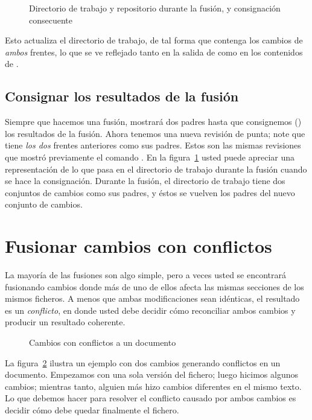 \begin{figure}[ht]
  \centering
  \caption{Directorio de trabajo y repositorio durante la fusión, y
  consignación consecuente}
  \label{fig:tour-merge:merge}
\end{figure}

Esto actualiza el directorio de trabajo, de tal forma que contenga los
cambios de \emph{ambos} frentes, lo que se ve reflejado tanto en la
salida de  como en los contenidos de .

\subsection{Consignar los resultados de la fusión}

Siempre que hacemos una fusión,  mostrará dos padres
hasta que consignemos () los resultados de la fusión.
Ahora tenemos una nueva revisión de punta; note que tiene \emph{los
dos} frentes anteriores como sus padres. Estos son las mismas
revisiones que mostró previamente el comando .
En la figura~\ref{fig:tour-merge:merge} usted puede apreciar una
representación de lo que pasa en el directorio de trabajo durante la
fusión cuando se hace la consignación. Durante la fusión, el
directorio de trabajo tiene dos conjuntos de cambios como sus padres,
y éstos se vuelven los padres del nuevo conjunto de cambios.

\section{Fusionar cambios con conflictos}

La mayoría de las fusiones son algo simple, pero a veces usted se
encontrará fusionando cambios donde más de uno de ellos afecta las
mismas secciones de los mismos ficheros. A menos que ambas
modificaciones sean idénticas, el resultado es un \emph{conflicto}, en
donde usted debe decidir cómo reconciliar ambos cambios y producir un
resultado coherente.

\begin{figure}[ht]
  \centering
  \caption{Cambios con conflictos a un documento}
  \label{fig:tour-merge:conflict}
\end{figure}

La figura~\ref{fig:tour-merge:conflict} ilustra un ejemplo con dos
cambios generando conflictos en un documento. Empezamos con una sola
versión del fichero; luego hicimos algunos cambios; mientras tanto,
alguien más  hizo cambios diferentes en el mismo texto. Lo que debemos
hacer para resolver el conflicto causado por ambos cambios es decidir
cómo debe quedar finalmente el fichero.

